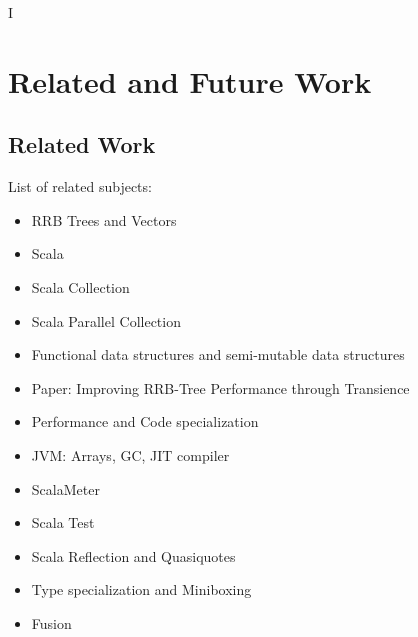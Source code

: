 I%

\chapter{Related and Future Work} %

\label{RelatedWork} %


\section{Related Work}

List of related subjects:
\begin{itemize}
  \item RRB Trees and Vectors \cite{RRBTrees, lorange2014rrb, cormen2001introduction}
  \item Scala \cite{odersky2008programming}
  \item Scala Collection \cite{ 1979992642, Oliveira:2010:TCO:1869459.1869489}
  \item Scala Parallel Collection \cite{collect11,Lea:2000:JFF:337449.337465, 6264/THESES, Prokopec:2014aa}
  \item Functional data structures and semi-mutable data structures \cite{DBLP:journals/jfp/HinzeP06, Driscoll:1989:MDS:64313.64317,4637966}
  \item Paper: Improving RRB-Tree Performance through Transience \cite{lorange2014rrb}
  \item Performance and Code specialization \cite{5456/THESES, Chafi:2011:DAH:1941553.1941561}
  \item JVM: Arrays, GC, JIT compiler \cite{Kotzmann:2008:DJH:1369396.1370017, Paleczny:2001:JHT:1267847.1267848, Wurthinger:2011:EGC:2048147.2048168}
  \item ScalaMeter \cite{Georges:2007:SRJ:1297027.1297033}
  \item Scala Test
  \item Scala Reflection and Quasiquotes \cite{EPFL-CONF-186844, quasiquotes}
  \item Type specialization and Miniboxing \cite{Ureche:2013:MIS:2509136.2509537, Ureche:2014:LDL:2660193.2660197, Stucki:2013:BIS:2489837.2489847, 4820/THESES}
  \item Fusion \cite{Coutts:2007:SFL:1291151.1291199, ScalaBlitz}
\end{itemize}

